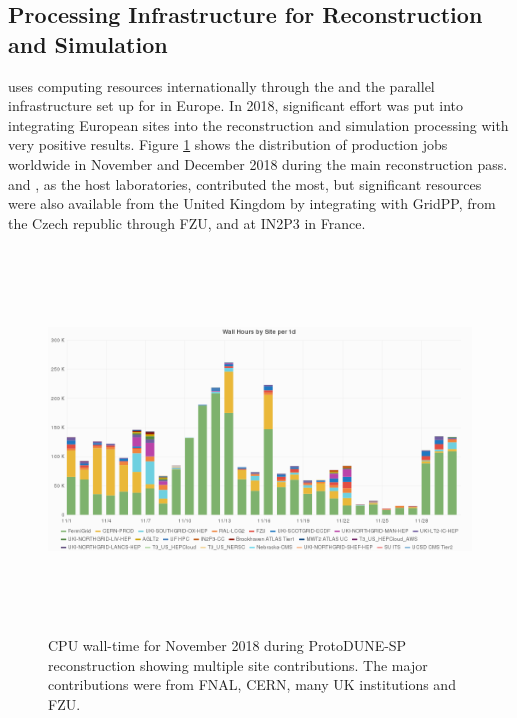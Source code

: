 \subsection{Processing Infrastructure for Reconstruction and Simulation}
\label{ch-comp-processing}
 uses computing resources internationally through the  and the parallel infrastructure set up for  in Europe.  In 2018, significant effort was put into integrating European sites into the  reconstruction and simulation processing with very positive results.  
Figure \ref{fig:ch-exec-comp-cpupie} shows the distribution of production jobs worldwide in November and December 2018 during the main reconstruction pass.   and , as the host laboratories, contributed the most, but significant resources were also available from the United Kingdom by integrating with GridPP, from the Czech republic through FZU, and at IN2P3 in France. 

\begin{figure}[htp]
\centering
\includegraphics[height=4in]{graphics/comp-vo-summary.png}

\caption{CPU wall-time for November 2018 during ProtoDUNE-SP reconstruction showing multiple site contributions.  The major contributions were from FNAL, CERN, many UK institutions and FZU.}
\label{fig:ch-exec-comp-cpupie}
\end{figure}

